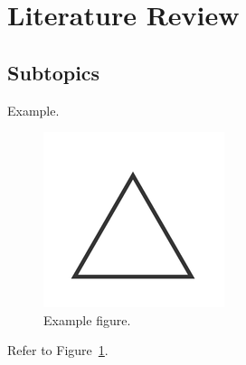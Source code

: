\section{Literature Review}

\subsection{Subtopics}

Example.

\begin{figure}[H]
  \centering
  \includegraphics{assets/example.png}
  \caption{Example figure.}
  \label{fig:example}
\end{figure}

Refer to Figure~\ref{fig:example}.
